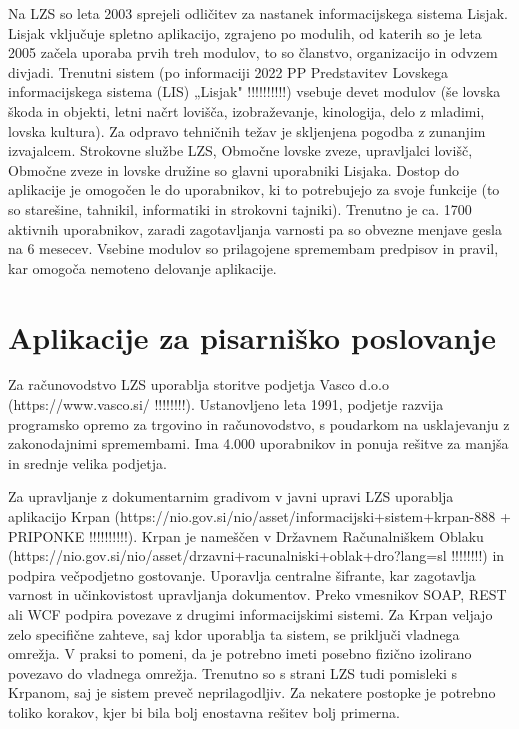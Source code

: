 \documentclass[a4paper,12pt,openright]{book}
\begin{document}
Na LZS so leta 2003 sprejeli odličitev za nastanek informacijskega sistema Lisjak. 
Lisjak vključuje spletno aplikacijo, zgrajeno po modulih, od katerih so je leta 2005 začela uporaba prvih treh modulov, to so članstvo, organizacijo in odvzem divjadi.
Trenutni sistem (po informaciji 2022 PP Predstavitev Lovskega informacijskega sistema (LIS) „Lisjak" !!!!!!!!!!) vsebuje devet modulov (še lovska škoda in objekti, letni načrt lovišča, izobraževanje, kinologija, delo z mladimi, lovska kultura).
Za odpravo tehničnih težav je skljenjena pogodba z zunanjim izvajalcem.
Strokovne službe LZS, Območne lovske zveze, upravljalci lovišč, Območne zveze in lovske družine so glavni uporabniki Lisjaka.
Dostop do aplikacije je omogočen le do uporabnikov, ki to potrebujejo za svoje funkcije (to so starešine, tahnikil, informatiki in strokovni tajniki).
Trenutno je ca. 1700 aktivnih uporabnikov, zaradi zagotavljanja varnosti pa so obvezne menjave gesla na 6 mesecev.
Vsebine modulov so prilagojene spremembam predpisov in pravil, kar omogoča nemoteno delovanje aplikacije.

\section{Aplikacije za pisarniško poslovanje}

Za računovodstvo LZS uporablja storitve podjetja Vasco d.o.o (https://www.vasco.si/ !!!!!!!!).
Ustanovljeno leta 1991, podjetje razvija programsko opremo za trgovino in računovodstvo, s poudarkom na usklajevanju z zakonodajnimi spremembami. 
Ima 4.000 uporabnikov in ponuja rešitve za manjša in srednje velika podjetja.

Za upravljanje z dokumentarnim gradivom v javni upravi LZS uporablja aplikacijo Krpan (https://nio.gov.si/nio/asset/informacijski+sistem+krpan-888 + PRIPONKE !!!!!!!!!!). 
Krpan je nameščen v Državnem Računalniškem Oblaku (https://nio.gov.si/nio/asset/drzavni+racunalniski+oblak+dro?lang=sl !!!!!!!!) in podpira večpodjetno gostovanje.
Uporavlja centralne šifrante, kar zagotavlja varnost in učinkovistost upravljanja dokumentov.
Preko vmesnikov SOAP, REST ali WCF podpira povezave z drugimi informacijskimi sistemi.
Za Krpan veljajo zelo specifične zahteve, saj kdor uporablja ta sistem, se priključi vladnega omrežja.
V praksi to pomeni, da je potrebno imeti posebno fizično izolirano povezavo do vladnega omrežja.
Trenutno so s strani LZS tudi pomisleki s Krpanom, saj je sistem preveč neprilagodljiv.
Za nekatere postopke je potrebno toliko korakov, kjer bi bila bolj enostavna rešitev bolj primerna.
\end{document}
